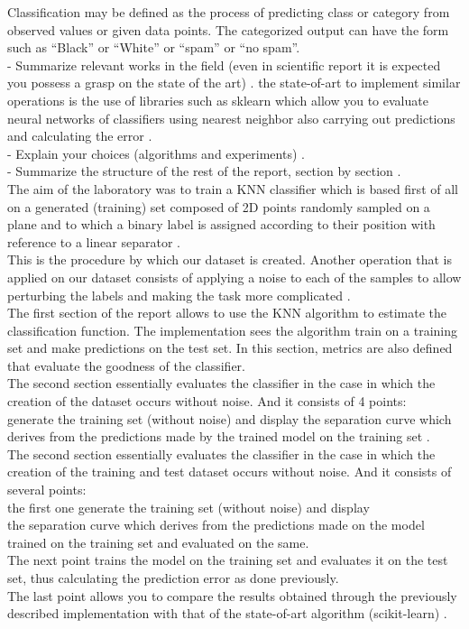 \documentclass[a4paper,10pt,oneside]{article}
\begin{document}
\begin{sloppy}
Classification may be defined as the process of predicting class or
category from observed values or given data points. 
The categorized output can have the form such as “Black” or 
“White” or “spam” or “no spam”.
\\
- Summarize relevant works in the field (even in scientific report it is
expected you possess a grasp on the state of the art) .
the state-of-art to implement similar operations is the use of libraries 
such as sklearn which allow you to evaluate neural networks of classifiers
using nearest neighbor also carrying out predictions and calculating the error .
\\
- Explain your choices (algorithms and experiments) .
\\
- Summarize the structure of the rest of the report, section by section .
\\
The aim of the laboratory was to train a KNN classifier which is based 
first of all on a generated (training) set composed of 2D points randomly 
sampled on a plane and to which a binary label is assigned according 
to their position with reference to a linear separator . \\
This is the procedure by which our dataset is created.
Another operation that is applied on our dataset consists of applying a
noise to each of the samples to allow perturbing the labels and making 
the task more complicated .\\
The first section of the report allows to use the KNN algorithm 
to estimate the classification function. 
The implementation sees the algorithm train on a training set and 
make predictions on the test set. 
In this section, metrics are also defined that evaluate the goodness 
of the classifier.
\\
The second section essentially evaluates the classifier in the case in which 
the creation of the dataset occurs without noise.
And it consists of 4 points: \\
generate the training set (without noise) and display the separation curve 
which derives from the predictions made by the trained model on the 
training set . 
\\
The second section essentially evaluates the classifier in the case in which the 
creation of the training and test dataset occurs without noise.
And it consists of several points:\\
the first one generate the training set (without noise) and display \\
the separation curve which derives from the predictions made on the model \\
trained on the training set and evaluated on the same.\\
The next point trains the model on the training set and evaluates it on 
the test set, thus calculating the prediction error as done previously. \\
The last point allows you to compare the results obtained through the previously 
described implementation with that of the state-of-art algorithm (scikit-learn) .





\end{sloppy}
\end{document}
